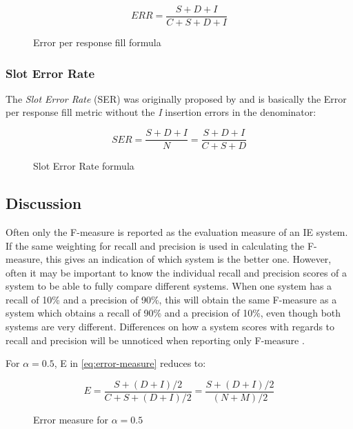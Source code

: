 \begin{figure}[H]
\begin{displaymath}
	ERR = \frac{S+D+I}{C+S+D+I}
\end{displaymath}
\caption{Error per response fill formula}
\label{eq:error-per-response-fill}
\end{figure}

\subsubsection{Slot Error Rate}
The \textit{Slot Error Rate} (SER) was originally proposed by \citeauthor{Makhoul:1999} \cite{Makhoul:1999} and is basically the Error per response fill metric without the \textit{I} insertion errors in the denominator:

\begin{figure}[H]
\begin{displaymath}
	SER = \frac{S+D+I}{N} = \frac{S+D+I}{C+S+D}
\end{displaymath}
\caption{Slot Error Rate formula}
\end{figure}

\subsection{Discussion}
Often only the F-measure is reported as the evaluation measure of an IE system. If the same weighting for recall and precision is used in calculating the F-measure, this gives an indication of which system is the better one. However, often it may be important to know the individual recall and precision scores of a system to be able to fully compare different systems. When one system has a recall of 10\% and a precision of 90\%, this will obtain the same F-measure as a system which obtains a recall of 90\% and a precision of 10\%, even though both systems are very different. Differences on how a system scores with regards to recall and precision will be unnoticed when reporting only F-measure \cite{Sitter:2004}.

For $\alpha = 0.5$, E in \ref{eq:error-measure} reduces to:

\begin{figure}[H]
\begin{displaymath}
	E = \frac{S + (D+I)/2}{C+S+(D+I)/2} = \frac{S + (D+I)/2}{(N+M)/2}
\end{displaymath}
\caption{Error measure for $\alpha = 0.5$}
\label{eq:error-measure2}
\end{figure}

